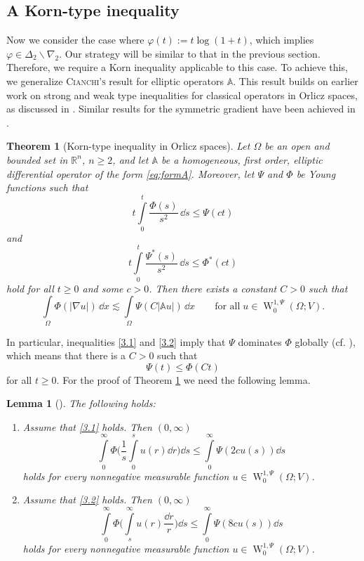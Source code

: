 \documentclass[a4paper,11pt]{amsart}
\numberwithin{equation}{section}
\newcommand{\R}{\mathbb{R}}
\newcommand{\sobo}{\operatorname{W}}
\newtheorem{lemma}[defi]{Lemma}
\newtheorem{satz}[defi]{Theorem}
\begin{document}
	\subsection{A Korn-type inequality}
	Now we consider the case where $\varphi(t) := t \log (1+t)$, which implies $\varphi \in \Delta_2 \backslash \nabla_2$. Our strategy will be similar to that in the previous section. Therefore, we require a Korn inequality applicable to this case. To achieve this, we generalize \textsc{Cianchi's} result \cite[Theorem 3.1]{cianchi_korn_2014} for elliptic operators $\mathbb{A}$. This result builds on earlier work on strong and weak type inequalities for classical operators in Orlicz spaces, as discussed in \cite{cianchi2}. Similar results for the symmetric gradient have been achieved in \cite{breit_trace-free_2017}.
	\begin{satz}[Korn-type inequality in Orlicz spaces] \label{lem:cianchi_ver}
		Let $\Omega$ be an open and bounded set in $\R^n$, $n \geq 2$, and let $\mathbb{A}$ be a homogeneous, first order, elliptic differential operator of the form \eqref{eq:formA}. Moreover, let $\Psi$ and $\Phi$ be Young functions such that
		\begin{equation}
			t \int \limits_{0}^t \frac{\Phi(s)}{s^2} \, \dd{s} \leq \Psi(ct)  \label{3.1}
		\end{equation}
		and 
		\begin{equation}
			t \int \limits_{0}^t \frac{\Psi^*(s)}{s^2} \, \dd{s} \leq \Phi^*(ct) \label{3.2}
		\end{equation}
		hold for all $t \geq 0$ and some $c > 0$. Then there exists a constant $C > 0$ such that
		\[
		\int \limits_\Omega \Phi(|\nabla u|) \, \dd{x} \lesssim \int \limits_\Omega \Psi(C|\mathbb{A}u|) \, \dd{x}\qquad\text{for all}\; u \in \sobo_0^{1,\Psi}(\Omega;V).
		\]
	\end{satz}
	In particular, inequalities \eqref{3.1} and \eqref{3.2} imply that $\Psi$ dominates $\Phi$ globally (cf. \cite[Proposition 3.5]{cianchi_korn_2014}), which means that there is a $C>0$ such that \[
	\Psi(t) \leq \Phi(Ct)
	\]
	for all $t \geq 0$. For the proof of Theorem \ref{lem:cianchi_ver} we need the following lemma.
	\begin{lemma}[{{\cite[Lemmas 5.2 and 5.4]{cianchi_korn_2014}}}] \label{lem:cianchi_hardy} The following holds:
		\begin{enumerate}
			\item Assume that \eqref{3.1} holds. Then $(0,\infty)$  \[
			\int \limits_0^\infty \Phi \Big( \frac{1}{s} \int \limits_0^s u(r) \dd{r} \Big) \dd{s} \leq \int \limits_0^\infty \Psi( 2c  u(s)) \dd{s}
			\]
			holds for every nonnegative measurable function $u \in \sobo_0^{1,\Psi}(\Omega;V)$.
			\item Assume that \eqref{3.2} holds. Then $(0,\infty)$ \[
			\int \limits_0^\infty \Phi \Big(  \int \limits_s^\infty u(r) \frac{\dd{r}}{r} \Big) \dd{s} \leq \int \limits_0^\infty \Psi(8c u(s)) \dd{s}
			\]
			holds for every nonnegative measurable function $u \in \sobo_0^{1,\Psi}(\Omega;V)$.
		\end{enumerate}
		
	\end{lemma}
\end{document}

